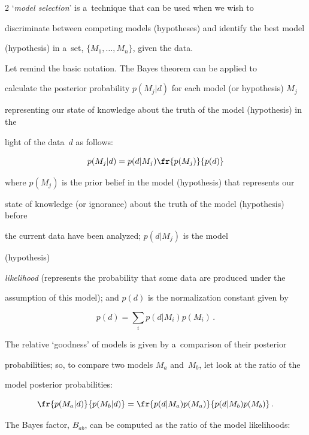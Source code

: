 \begin{multicols}{2}
`\textit{model selection}' is a~technique that can be used when we wish to


discriminate between competing models (hypotheses) and identify the best model


(hypothesis) in a~set, $\{M_1,\ldots , M_n\}$, given the data.





  Let remind the basic notation. The Bayes theorem can be applied to


calculate the posterior probability $p(M_j\vert d)$ for each model (or hypothesis) $M_j$


representing our state of knowledge about  the truth of the model (hypothesis) in the


light of the data~$d$ as follows:


  $$


  p(M_j\vert d) = p(d\vert M_j) \fr{p(M_j)}{p(d)}


  $$


  where $p(M_j)$ is the prior belief in the model (hypothesis) that represents our


state of knowledge (or ignorance) about the truth of the model (hypothesis) before


the  current data have been analyzed; $p(d\vert M_j)$ is the model


 (hypothesis)


\textit{likelihood} (represents the probability that some data are produced under the


assumption of this model);  and $p(d)$ is the normalization constant given by


  $$


  p(d) = \sum\limits_i p(d\vert M_i) p(M_i)\,.


  $$





  The relative `goodness' of models is given by a~comparison of their posterior


probabilities; so, to compare two models $M_a$ and~$M_b$, let look at the ratio of the


model posterior probabilities:


  $$


  \fr{p(M_a\vert d)}{p(M_b\vert d)} = \fr{ p(d\vert M_a)p(M_a)}{p(d\vert M_b)p(M_b)}\,.


  $$


  The Bayes factor, $B_{ab}$, can be computed as the ratio of the model likelihoods:



\end{multicols}
